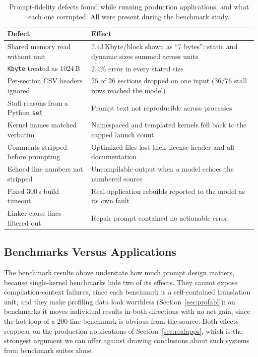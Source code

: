 \begin{table}[t]
\centering
\footnotesize
\setlength{\tabcolsep}{3pt}
\caption{Prompt-fidelity defects found while running production applications, and what each one
  corrupted. All were present during the benchmark study.}
\label{tab:defects}
\begin{tabular}{@{}p{}p{}@{}}
\toprule
\textbf{Defect} & \textbf{Effect} \\
\midrule
Shared memory read without unit & $7.43$\,Kbyte/block shown as ``7 bytes''; static and dynamic sizes
  summed across units \\
\texttt{Kbyte} treated as $1024$\,B & $2.4\%$ error in every stated size \\
Per-section CSV headers ignored & $25$ of $26$ sections dropped on one input ($36/76$ stall rows
  reached the model) \\
Stall reasons from a Python \texttt{set} & Prompt text not reproducible across processes \\
Kernel names matched verbatim & Namespaced and templated kernels fell back to the capped launch count \\
Comments stripped before prompting & Optimized files lost their license header and all documentation \\
Echoed line numbers not stripped & Uncompilable output when a model echoes the numbered source \\
Fixed $300$\,s build timeout & Real-application rebuilds reported to the model as its own fault \\
Linker cause lines filtered out & Repair prompt contained no actionable error \\
\bottomrule
\end{tabular}
\end{table}

\subsection{Benchmarks Versus Applications}
The benchmark results above understate how much prompt design matters, because single-kernel benchmarks
hide two of its effects. They cannot expose compilation-context failures, since each benchmark is a
self-contained translation unit; and they make profiling data look worthless
(Section~\ref{sec:profabl}): on benchmarks it moves individual results in both directions with no net
gain, since the hot loop of a $200$-line benchmark is obvious from the source.
Both effects reappear on the production applications of Section~\ref{sec:realapps}, which is the
strongest argument we can offer against drawing conclusions about such systems from benchmark suites
alone.
